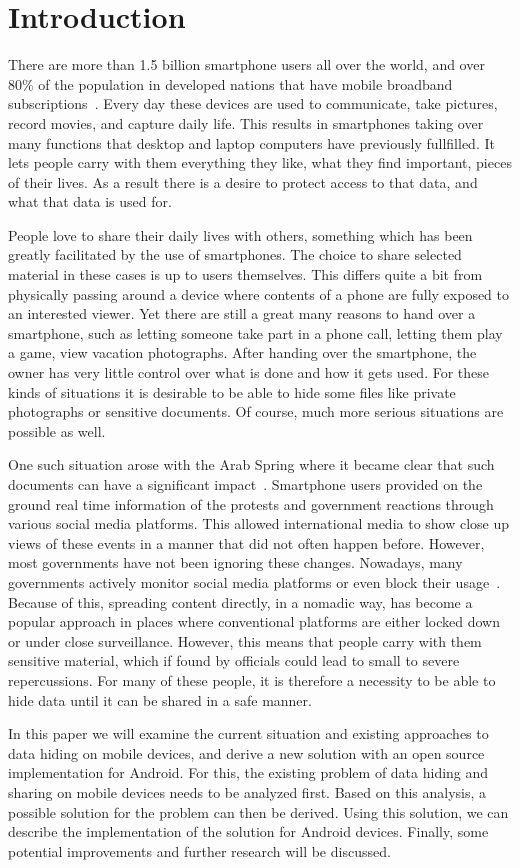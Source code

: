 \section{Introduction}
\label{sec:introduction}
There are more than 1.5 billion smartphone users all over the world\cite{smartphoneUsage}, and over 80\% of the population in developed nations that have mobile broadband subscriptions~\cite{mobileBroadband}.
Every day these devices are used to communicate, take pictures, record movies, and capture daily life.
This results in smartphones taking over many functions that desktop and laptop computers have previously fullfilled.
It lets people carry with them everything they like, what they find important, pieces of their lives.
As a result there is a desire to protect access to that data, and what that data is used for.

People love to share their daily lives with others, something which has been greatly facilitated by the use of smartphones.
The choice to share selected material in these cases is up to users themselves. 
This differs quite a bit from physically passing around a device where contents of a phone are fully exposed to an interested viewer.
Yet there are still a great many reasons to hand over a smartphone, such as letting someone take part in a phone call, letting them play a game, view vacation photographs.
After handing over the smartphone, the owner has very little control over what is done and how it gets used.
For these kinds of situations it is desirable to be able to hide some files like private photographs or sensitive documents.
Of course, much more serious situations are possible as well.

One such situation arose with the Arab Spring where it became clear that such documents can have a significant impact~\cite{arabSpring}.
Smartphone users provided on the ground real time information of the protests and government reactions through various social media platforms.
This allowed international media to show close up views of these events in a manner that did not often happen before.
However, most governments have not been ignoring these changes.
Nowadays, many governments actively monitor social media platforms or even block their usage~\cite{cyberResponseGovernment}.
Because of this, spreading content directly, in a nomadic way, has become a popular approach in places where conventional platforms are either locked down or under close surveillance.
However, this means that people carry with them sensitive material, which if found by officials could lead to small to severe repercussions.
For many of these people, it is therefore a necessity to be able to hide data until it can be shared in a safe manner.

In this paper we will examine the current situation and existing approaches to data hiding on mobile devices, and derive a new solution with an open source implementation for Android.
For this, the existing problem of data hiding and sharing on mobile devices needs to be analyzed first.
Based on this analysis, a possible solution for the problem can then be derived.
Using this solution, we can describe the implementation of the solution for Android devices.
Finally, some potential improvements and further research will be discussed.